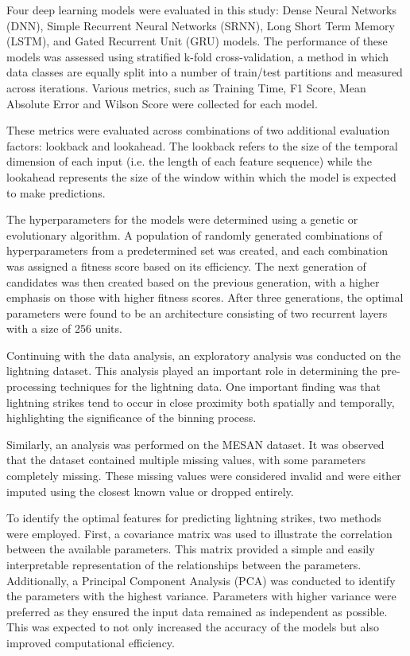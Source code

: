 Four deep learning models were evaluated in this study: Dense Neural Networks (DNN), Simple Recurrent Neural Networks (SRNN), Long Short Term Memory (LSTM), and Gated Recurrent Unit (GRU) models. The performance of these models was assessed using stratified k-fold cross-validation, a method in which data classes are equally split into a number of train/test partitions and measured across iterations. Various metrics, such as Training Time, F1 Score, Mean Absolute Error and Wilson Score were collected for each model.

These metrics were evaluated across combinations of two additional evaluation factors: lookback and lookahead. The lookback refers to the size of the temporal dimension of each input (i.e. the length of each feature sequence) while the lookahead represents the size of the window within which the model is expected to make predictions.

The hyperparameters for the models were determined using a genetic or evolutionary algorithm. A population of randomly generated combinations of hyperparameters from a predetermined set was created, and each combination was assigned a fitness score based on its efficiency. The next generation of candidates was then created based on the previous generation, with a higher emphasis on those with higher fitness scores. After three generations, the optimal parameters were found to be an architecture consisting of two recurrent layers with a size of 256 units.


Continuing with the data analysis, an exploratory analysis was conducted on the lightning dataset. This analysis played an important role in determining the pre-processing techniques for the lightning data. One important finding was that lightning strikes tend to occur in close proximity both spatially and temporally, highlighting the significance of the binning process.

Similarly, an analysis was performed on the MESAN dataset. It was observed that the dataset contained multiple missing values, with some parameters completely missing. These missing values were considered invalid and were either imputed using the closest known value or dropped entirely. 

To identify the optimal features for predicting lightning strikes, two methods were employed. First, a covariance matrix was used to illustrate the correlation between the available parameters. This matrix provided a simple and easily interpretable representation of the relationships between the parameters. Additionally, a Principal Component Analysis (PCA) was conducted to identify the parameters with the highest variance. Parameters with higher variance were preferred as they ensured the input data remained as independent as possible. This was expected to not only increased the accuracy of the models but also improved computational efficiency.

